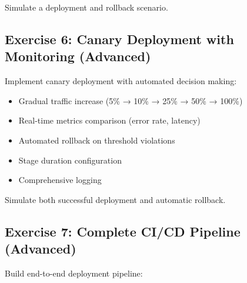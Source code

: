 Simulate a deployment and rollback scenario.

\subsection{Exercise 6: Canary Deployment with Monitoring (Advanced)}

Implement canary deployment with automated decision making:
\begin{itemize}
    \item Gradual traffic increase (5\% → 10\% → 25\% → 50\% → 100\%)
    \item Real-time metrics comparison (error rate, latency)
    \item Automated rollback on threshold violations
    \item Stage duration configuration
    \item Comprehensive logging
\end{itemize}

Simulate both successful deployment and automatic rollback.

\subsection{Exercise 7: Complete CI/CD Pipeline (Advanced)}

Build end-to-end deployment pipeline:

